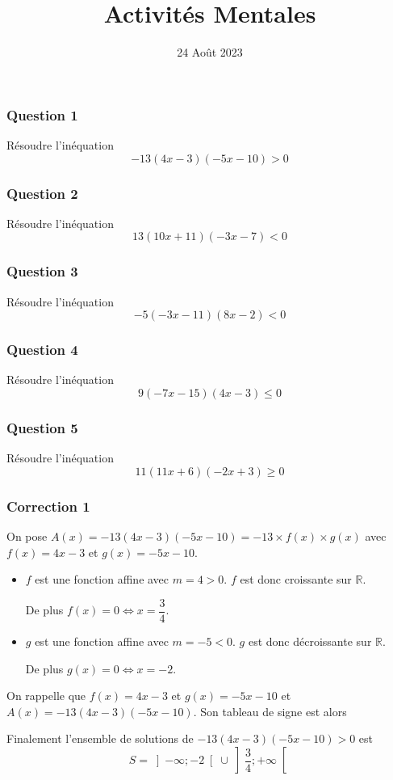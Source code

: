 \documentclass[15pt, mathserif]{beamer}
\title{Activités Mentales}
\date{24 Août 2023}
\begin{document}
\begin{frame}
    \titlepage
\end{frame}

\begin{frame} 
	\frametitle{Question 1}
Résoudre l'inéquation \[-13(4x-3)(-5x-10)>0\]\end{frame}


\begin{frame} 
	\frametitle{Question 2}
Résoudre l'inéquation \[13(10x+11)(-3x-7)<0\]\end{frame}


\begin{frame} 
	\frametitle{Question 3}
Résoudre l'inéquation \[-5(-3x-11)(8x-2)<0\]\end{frame}


\begin{frame} 
	\frametitle{Question 4}
Résoudre l'inéquation \[9(-7x-15)(4x-3)\leq0\]\end{frame}


\begin{frame} 
	\frametitle{Question 5}
Résoudre l'inéquation \[11(11x+6)(-2x+3)\geq0\]\end{frame}


\begin{frame}
\vspace{-10mm}
	\frametitle{Correction 1}
On pose $A(x) = -13(4x-3)(-5x-10) = -13\times f(x) \times g(x)$ avec $f(x) = 4x-3$ et $g(x) = -5x-10$.

\begin{itemize}
	\item $f$ est une fonction affine avec $m =4>0$. $f$ est donc croissante sur $\mathbb{R}$.

	 De plus $f(x) = 0 \Leftrightarrow x = \dfrac{3}{4}$.
	\item $g$ est une fonction affine avec $m =-5<0$. $g$ est donc décroissante sur $\mathbb{R}$.

	 De plus $g(x) = 0 \Leftrightarrow x = -2$.
\end{itemize}

 \end{frame}


\begin{frame}On rappelle que $f(x) = 4x-3$ et $g(x) = -5x-10$ et $A(x) = -13(4x-3)(-5x-10)$. Son tableau de signe est alors 

\medskip \hfil
{}

 Finalement l'ensemble de solutions de $-13(4x-3)(-5x-10)>0$ est\[S = \left]-\infty;-2\right[\cup\left]\dfrac{3}{4};+\infty\right[\]

\end{frame}
\end{document}
